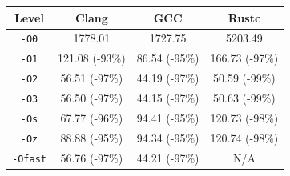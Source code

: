 \begin{tabular*}{\columnwidth}{@{\extracolsep\fill}cccc@{\extracolsep\fill}}
\toprule
\textbf{Level} & \textbf{Clang} & \textbf{GCC} & \textbf{Rustc} \\
\midrule
\texttt{-O0} & 1778.01 & 1727.75 & 5203.49 \\
\texttt{-O1} & 121.08 (-93\%) & 86.54 (-95\%) & 166.73 (-97\%) \\
\texttt{-O2} & 56.51 (-97\%) & 44.19 (-97\%) & 50.59 (-99\%) \\
\texttt{-O3} & 56.50 (-97\%) & 44.15 (-97\%) & 50.63 (-99\%) \\
\texttt{-Os} & 67.77 (-96\%) & 94.41 (-95\%) & 120.73 (-98\%) \\
\texttt{-Oz} & 88.88 (-95\%) & 94.34 (-95\%) & 120.74 (-98\%) \\
\texttt{-Ofast} & 56.76 (-97\%) & 44.21 (-97\%) & N/A \\
\bottomrule
\end{tabular*}
